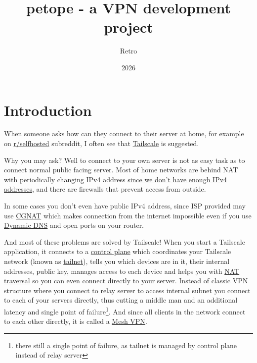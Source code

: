 \documentclass[a4paper]{article}
\title{petope - a VPN development project}
\author{Retro}
\date{2026}
\begin{document}
\maketitle

\newpage


\tableofcontents

\newpage


\section*{Introduction}

When someone asks how can they connect to their server at home,
for example on \href{https://www.reddit.com/r/selfhosted/}{r/selfhosted} subreddit,
I often see that \href{https://tailscale.com/}{Tailscale} is suggested.

Why you may ask? Well to connect to your own server is not as easy task as
to connect normal public facing server.
Most of home networks are behind NAT with periodically changing IPv4 address
\href{https://en.wikipedia.org/wiki/IPv4_address_exhaustion}{since we don't have enough IPv4 addresses},
and there are firewalls that prevent access from outside.

In some cases you don't even have public IPv4 address,
since ISP provided may use \href{https://en.wikipedia.org/wiki/Carrier-grade_NAT}{CGNAT}
which makes connection from the internet impossible even if you use \href{https://en.wikipedia.org/wiki/Dynamic_DNS}{Dynamic DNS}
and open ports on your router.

And most of these problems are solved by Tailscale!
When you start a Tailscale application, it connects to a \href{https://tailscale.com/docs/concepts/control-data-planes}{control plane}
which coordinates your Tailscale network (known as \href{https://tailscale.com/docs/concepts/tailnet}{tailnet}),
tells you which devices are in it, their internal addresses, public key, manages access to each device
and helps you with \href{https://tailscale.com/blog/how-nat-traversal-works}{NAT traversal}
so you can even connect directly to your server.
Instead of classic VPN structure where you connect to relay server to access internal subnet
you connect to each of your servers directly, thus cutting a middle man and an additional latency
and single point of failure\footnote{there still a single point of failure, as tailnet is managed by control plane instead of relay server}.
And since all clients in the network connect to each other directly,
it is called a \href{https://en.wikipedia.org/wiki/Mesh_networking}{Mesh VPN}.
\end{document}
